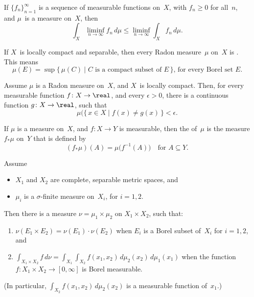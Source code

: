 \begin{cor} \label{FatousLemma}
If $\{f_n\}_{n=1}^\infty$ is a sequence of measurable functions on~$X$, with $f_n \ge 0$ for all~$n$, and $\mu$~is a measure on~$X$, then
	$$ \int_X \liminf_{n \to \infty} f_n \, d\mu \le \liminf_{n \to \infty} \int_X f_n \, d\mu .$$
\end{cor}

\begin{prop}
If $X$~is locally compact and separable, then every Radon measure~$\mu$ on~$X$ is . This means 
	$$ \text{$\mu(E) = \sup\{\, \mu(C) \mid \text{$C$ is a compact subset of~$E$} \,\}$,
	\ for every Borel set~$E$}. $$
\end{prop}

\begin{prop} \label{LusinsThm}
Assume $\mu$ is a Radon measure on~$X$, and $X$~is locally compact. Then, for every measurable function $f \colon X \to \real$, and every $\epsilon > 0$, there is a continuous function $g \colon X \to \real$, such that 
	$$ \mu \bigl( \{\, x \in X \mid f(x) \neq g(x) \,\} < \epsilon .$$
\end{prop}

\begin{defn} \label{PushForwardDefn}
If $\mu$ is a measure on~$X$, and $f \colon X \to Y$ is measurable, then the  of~$\mu$ is the measure 
	$f_*\mu$ on~$Y$ that is defined by
		$$ (f_* \mu)(A) = \mu \bigl( f^{-1}(A) \bigr) 
		\quad \text{for $A \subseteq Y$} . $$
\end{defn}

\begin{prop}
Assume
	\begin{itemize}
	\item $X_1$ and $X_2$ are complete, separable metric spaces, 
	and
	\item $\mu_i$ is a $\sigma$-finite measure on~$X_i$, for $i = 1,2$.
	\end{itemize}
Then there is a measure $\nu = \mu_1 \times \mu_2$ on $X_1 \times X_2$, such that:
	\begin{enumerate}
	\item $\nu(E_1 \times E_2) = \nu(E_1) \cdot \nu(E_2)$ when $E_i$ is a Borel subset of~$X_i$ for $i = 1,2$,
	and
	\item $\int_{X_1 \times X_2} f \, d\nu = \int_{X_1} \int_{X_2} f(x_1,x_2) \, d\mu_2(x_2) \, d \mu_1(x_1)$ when the function
	$f \colon X_1 \times X_2 \to [0,\infty]$ is Borel measurable.
	\end{enumerate}
\textup(In particular, $\int_{X_2} f(x_1,x_2) \, d\mu_2(x_2)$ is a measurable function of~$x_1$.\textup)
\end{prop}

